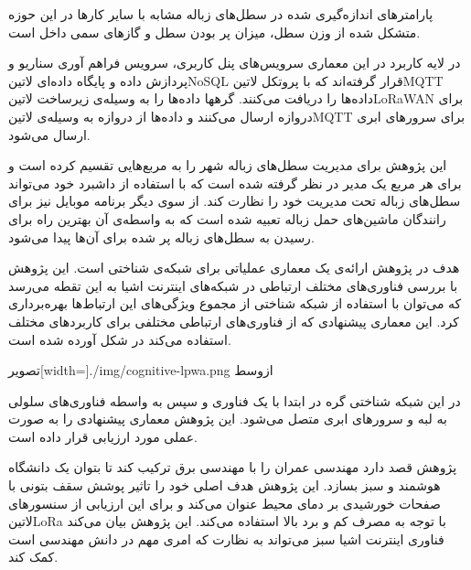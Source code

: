 پارامترهای اندازه‌گیری شده در سطل‌های زباله مشابه با سایر کارها در این حوزه متشکل شده از وزن سطل، میزان پر بودن سطل و گازهای سمی داخل است.

در لایه کاربرد در این معماری سرویس‌های پنل کاربری، سرویس فراهم آوری سناریو و پردازش داده و پایگاه داده‌ای ‌لاتین{NoSQL} قرار گرفته‌اند که با پروتکل ‌لاتین{MQTT} داده‌ها را دریافت می‌کنند.
گرهها داده‌ها را به وسیله‌ی زیرساخت ‌لاتین{LoRaWAN} برای دروازه ارسال می‌کنند و داده‌ها از دروازه به وسیله‌ی ‌لاتین{MQTT} برای سرورهای ابری ارسال می‌شود.

این پژوهش برای مدیریت سطل‌های زباله شهر را به مربع‌هایی تقسیم کرده است و برای هر مربع یک مدیر در نظر گرفته شده است که با استفاده از داشبرد خود می‌تواند سطل‌های زباله تحت مدیریت خود را نظارت کند.
از سوی دیگر برنامه موبایل نیز برای رانندگان ماشین‌های حمل زباله تعبیه شده است که به واسطه‌ی آن بهترین راه برای رسیدن به سطل‌های زباله پر شده برای آن‌ها پیدا می‌شود.



هدف در پژوهش  ارائه‌ی یک معماری عملیاتی برای شبکه‌ی شناختی است. این پژوهش با بررسی فناوری‌های مختلف ارتباطی در شبکه‌های اینترنت اشیا به این تقطه می‌رسد که می‌توان
با استفاده از شبکه شناختی از مجموع ویژگی‌های این ارتباط‌ها بهره‌برداری کرد. این معماری پیشنهادی که از فناوری‌های ارتباطی مختلفی برای کاربردهای مختلف استفاده می‌کند در شکل 
آورده شده است.

‌تصویر[width=\textwidth]{./img/cognitive-lpwa.png}
‌ازوسط

در این شبکه شناختی گره در ابتدا با یک فناوری و سپس به واسطه فناوری‌های سلولی به لبه و سرورهای ابری متصل می‌شود. این پژوهش معماری پیشنهادی را به صورت عملی مورد ارزیابی قرار داده است.



پژوهش  قصد دارد مهندسی عمران را با مهندسی برق ترکیب کند تا بتوان یک دانشگاه هوشمند و سبز بسازد. این پژوهش هدف اصلی خود را تاثیر پوشش سقف بتونی با صفحات خورشیدی
بر دمای محیط عنوان می‌کند و برای این ارزیابی از سنسورهای ‌لاتین{LoRa} با توجه به مصرف کم و برد بالا استفاده می‌کند. این پژوهش بیان می‌کند فناوری اینترنت اشیا سبز می‌تواند به نظارت که امری مهم
در دانش مهندسی است کمک کند.

